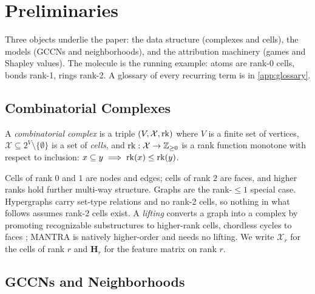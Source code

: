 \section{Preliminaries}
\label{sec:preliminaries}

Three objects underlie the paper: the data structure (complexes and
cells), the models (GCCNs and neighborhoods), and the attribution
machinery (games and Shapley values). The molecule is the running
example: atoms are rank-0 cells, bonds rank-1, rings rank-2. A
glossary of every recurring term is in \cref{app:glossary}.

\subsection{Combinatorial Complexes}
\label{sec:prelim-cc}

\begin{definition}
\label{def:cc}
A \emph{combinatorial complex} is a triple $(V, \mathcal{X}, \operatorname{rk})$ where
$V$ is a finite set of vertices, $\mathcal{X} \subseteq
2^{V}\setminus\{\emptyset\}$ is a set of \emph{cells}, and $\operatorname{rk} :
\mathcal{X} \to \mathbb{Z}_{\ge 0}$ is a rank function monotone with
respect to inclusion: $x \subseteq y \implies \operatorname{rk}(x) \le \operatorname{rk}(y)$.
\end{definition}

Cells of rank $0$ and $1$ are nodes and edges; cells of rank $2$ are
faces, and higher ranks hold further multi-way structure. Graphs are
the rank-$\le 1$ special case. Hypergraphs carry set-type relations
and no rank-2 cells, so nothing in what follows assumes rank-2 cells
exist. A \emph{lifting} converts a graph into a complex by promoting
recognizable substructures to higher-rank cells, \eg chordless cycles
to faces \citep{bodnar2021cwn}; MANTRA
\citep{ballester2025mantra} is natively higher-order and needs no
lifting. We write $\mathcal{X}_r$ for the cells of rank $r$ and
$\mathbf{H}_r$ for the feature matrix on rank $r$.

\subsection{GCCNs and Neighborhoods}
\label{sec:prelim-gccn}

